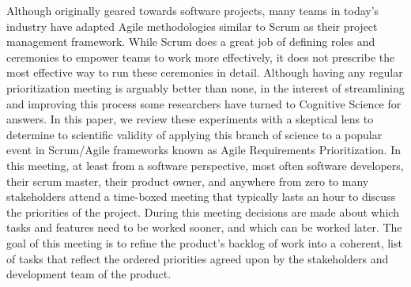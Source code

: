 Although originally geared towards software projects, many teams in today's industry have adapted Agile methodologies similar to Scrum as their project management framework. While Scrum does a great job of defining roles and ceremonies to empower teams to work more effectively, it does not prescribe the most effective way to run these ceremonies in detail. Although having any regular prioritization meeting is arguably better than none, in the interest of streamlining and improving this process some researchers have turned to Cognitive Science for answers. In this paper, we review these experiments with a skeptical lens to determine to scientific validity of applying this branch of science to a popular event in Scrum/Agile frameworks known as Agile Requirements Prioritization. In this meeting, at least from a software perspective, most often software developers, their scrum master, their product owner, and anywhere from zero to many stakeholders attend a time-boxed meeting that typically lasts an hour to discuss the priorities of the project. During this meeting decisions are made about which tasks and features need to be worked sooner, and which can be worked later. The goal of this meeting is to refine the product's backlog of work into a coherent, list of tasks that reflect the ordered priorities agreed upon by the stakeholders and development team of the product.
